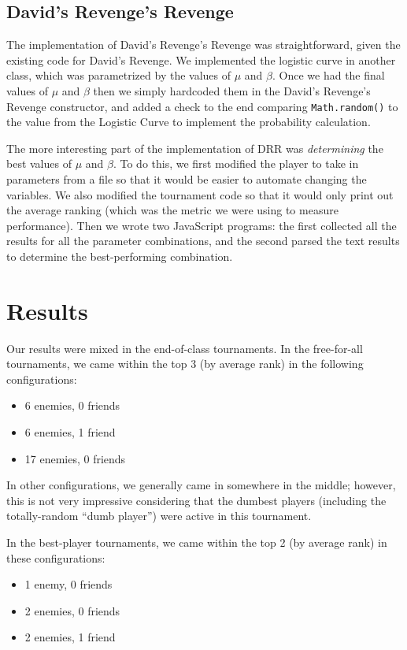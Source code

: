 \documentclass[
10pt, %
letterpaper, %
oneside, %
headinclude,footinclude, %
english
]{article}
\begin{document}
\subsection{David's Revenge's Revenge}

The implementation of David's Revenge's Revenge was straightforward, given the existing code for David's Revenge. We implemented the logistic curve in another class, which was parametrized by the values of $\mu$ and $\beta$. Once we had the final values of $\mu$ and $\beta$ then we simply hardcoded them in the David's Revenge's Revenge constructor, and added a check to the end comparing \texttt{Math.random()} to the value from the Logistic Curve to implement the probability calculation.

The more interesting part of the implementation of DRR was \textit{determining} the best values of $\mu$ and $\beta$. To do this, we first modified the player to take in parameters from a file so that it would be easier to automate changing the variables. We also modified the tournament code so that it would only print out the average ranking (which was the metric we were using to measure performance). Then we wrote two JavaScript programs: the first collected all the results for all the parameter combinations, and the second parsed the text results to determine the best-performing combination.

\section{Results}
Our results were mixed in the end-of-class tournaments. In the free-for-all tournaments, we came within the top 3 (by average rank) in the following configurations:
\begin{itemize}
  \item 6 enemies, 0 friends
  \item 6 enemies, 1 friend
  \item 17 enemies, 0 friends
\end{itemize}

In other configurations, we generally came in somewhere in the middle; however, this is not very impressive considering that the dumbest players (including the totally-random ``dumb player'') were active in this tournament.

In the best-player tournaments, we came within the top 2 (by average rank) in these configurations:
\begin{itemize}
  \item 1 enemy, 0 friends
  \item 2 enemies, 0 friends
  \item 2 enemies, 1 friend
\end{itemize}
\end{document}
